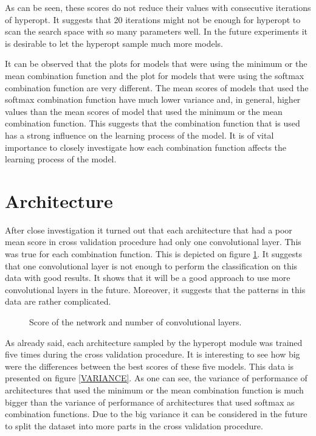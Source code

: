 \documentclass[a4paper,10pt]{report}
\begin{document}
    As can be seen, these scores do not reduce their values with consecutive iterations of hyperopt. It suggests that 20 iterations might not be enough for hyperopt to scan the search space with so many parameters well. In the future experiments it is desirable to let the hyperopt sample much more models.

    It can be observed that the plots for models that were using the minimum or the mean combination function and the plot for models that were using the softmax combination function are very different. The mean scores of models that used the softmax combination function have much lower variance and, in general, higher values than the mean scores of model that used the minimum or the mean combination function. This suggests that the combination function that is used has a strong influence on the learning process of the model. It is of vital importance to closely investigate how each combination function affects the learning process of the model.

    \section{Architecture}
    
    After close investigation it turned out that each architecture that had a poor mean score in cross validation procedure had only one convolutional layer. This was true for each combination function. This is depicted on figure \ref{Fig:SCORE_LAYER}. It suggests that one convolutional layer is not enough to perform the classification on this data with good results. It shows that it will be a good approach to use more convolutional layers in the future. Moreover, it suggests that the patterns in this data are rather complicated.
    
    \begin{figure}[!htb]\centering
      \begin {minipage}{\textwidth}
	\caption{Score of the network and number of convolutional layers.}\label{Fig:SCORE_LAYER}
      \end{minipage}
     \end{figure}
    

    As already said, each architecture sampled by the hyperopt module was trained five times during the cross validation procedure. It is interesting to see how big were the differences between the best scores of these five models. This data is presented on figure \ref{VARIANCE}. As one can see, the variance of performance of architectures that used the minimum or the mean combination function is much bigger than the variance of performance of architectures that used softmax as combination functions. Due to the big variance it can be considered in the future to split the dataset into more parts in the cross validation procedure.
\end{document}
